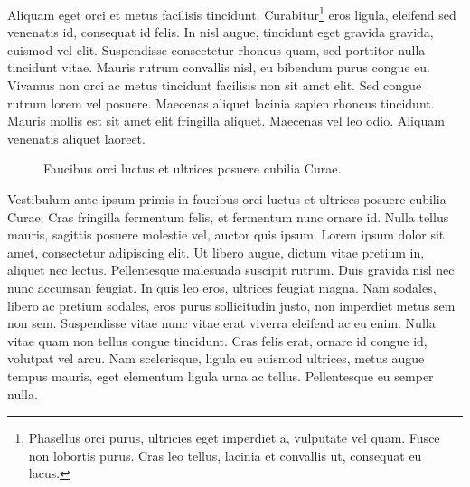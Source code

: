 \documentclass{EPUProjetDi}
\begin{document}
Aliquam eget orci et metus facilisis tincidunt. Curabitur\footnote{Phasellus orci purus, ultricies eget imperdiet a, vulputate vel quam. Fusce non lobortis purus. Cras leo tellus, lacinia et convallis ut, consequat eu lacus.} eros ligula, eleifend sed venenatis id, consequat id felis. In nisl augue, tincidunt eget gravida gravida, euismod vel elit. Suspendisse consectetur rhoncus quam, sed porttitor nulla tincidunt vitae. Mauris rutrum convallis nisl, eu bibendum purus congue eu. Vivamus non orci ac metus tincidunt facilisis non sit amet elit. Sed congue rutrum lorem vel posuere. Maecenas aliquet lacinia sapien rhoncus tincidunt. Mauris mollis est sit amet elit fringilla aliquet. Maecenas vel leo odio. Aliquam venenatis aliquet laoreet.

\begin{figure}[ht]
\begin{center}
\end{center}
\caption{Faucibus orci luctus et ultrices posuere cubilia Curae.}
\label{fig:Faucibus}
\end{figure}

Vestibulum ante ipsum primis in faucibus orci luctus et ultrices posuere cubilia Curae; Cras fringilla fermentum felis, et fermentum nunc ornare id. Nulla tellus mauris, sagittis posuere molestie vel, auctor quis ipsum. Lorem ipsum dolor sit amet, consectetur adipiscing elit. Ut libero augue, dictum vitae pretium in, aliquet nec lectus. Pellentesque malesuada suscipit rutrum. Duis gravida nisl nec nunc accumsan feugiat. In quis leo eros, ultrices feugiat magna. Nam sodales, libero ac pretium sodales, eros purus sollicitudin justo, non imperdiet metus sem non sem. Suspendisse vitae nunc vitae erat viverra eleifend ac eu enim. Nulla vitae quam non tellus congue tincidunt. Cras felis erat, ornare id congue id, volutpat vel arcu. Nam scelerisque, ligula eu euismod ultrices, metus augue tempus mauris, eget elementum ligula urna ac tellus. Pellentesque eu semper nulla.
\end{document}
